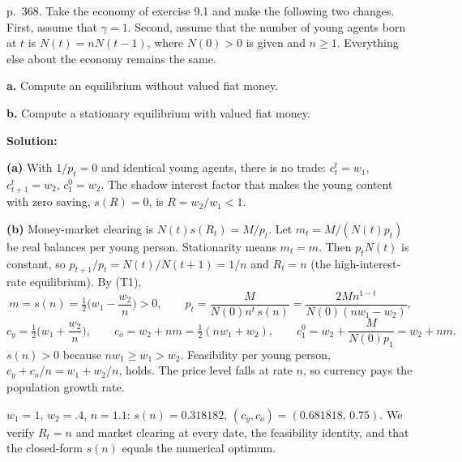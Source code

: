 \documentclass[12pt, letterpaper]{article}
\begin{document}
\begin{tcolorbox}[evenbox,title={Exercise 9.4 \quad Population growth}]
\begin{tcolorbox}[questionbox]
p.~368. Take the economy of exercise 9.1 and make the following two changes. First, assume that
$\gamma=1$. Second, assume that the number of young agents born at $t$ is $N(t)=nN(t-1)$, where
$N(0)>0$ is given and $n\ge1$. Everything else about the economy remains the same.

\textbf{a.} Compute an equilibrium without valued fiat money.

\textbf{b.} Compute a stationary equilibrium with valued fiat money.
\end{tcolorbox}

\textbf{Solution:}

\textbf{(a)} With $1/p_t=0$ and identical young agents, there is no trade: $c_t^t=w_1$,
$c_{t+1}^t=w_2$, $c_1^0=w_2$. The shadow interest factor that makes the young content with zero
saving, $s(R)=0$, is $R=w_2/w_1<1$.

\textbf{(b)} Money-market clearing is $N(t)s(R_t)=M/p_t$. Let $m_t=M/(N(t)p_t)$ be real balances per
young person. Stationarity means $m_t=m$. Then $p_tN(t)$ is constant, so $p_{t+1}/p_t=N(t)/N(t+1)=1/n$
and $\boxed{R_t=n}$ (the high-interest-rate equilibrium). By (T1),
\[
m=s(n)=\tfrac12\Big(w_1-\frac{w_2}n\Big)>0,\qquad p_t=\frac{M}{N(0)n^t\,s(n)}=\frac{2Mn^{1-t}}{N(0)(nw_1-w_2)},
\]
\[
c_y=\tfrac12\Big(w_1+\frac{w_2}n\Big),\qquad c_o=w_2+nm=\tfrac12(nw_1+w_2),\qquad c_1^0=w_2+\frac{M}{N(0)p_1}=w_2+nm.
\]
$s(n)>0$ because $nw_1\ge w_1>w_2$. Feasibility per young person, $c_y+c_o/n=w_1+w_2/n$, holds. The
price level falls at rate $n$, so currency pays the population growth rate.

\begin{tcolorbox}[databox]
$w_1=1$, $w_2=.4$, $n=1.1$: $s(n)=0.318182$, $(c_y,c_o)=(0.681818,\,0.75)$. We verify $R_t=n$ and
market clearing at every date, the feasibility identity, and that the closed-form $s(n)$ equals the
numerical optimum.
\end{tcolorbox}
\end{tcolorbox}
\end{document}
